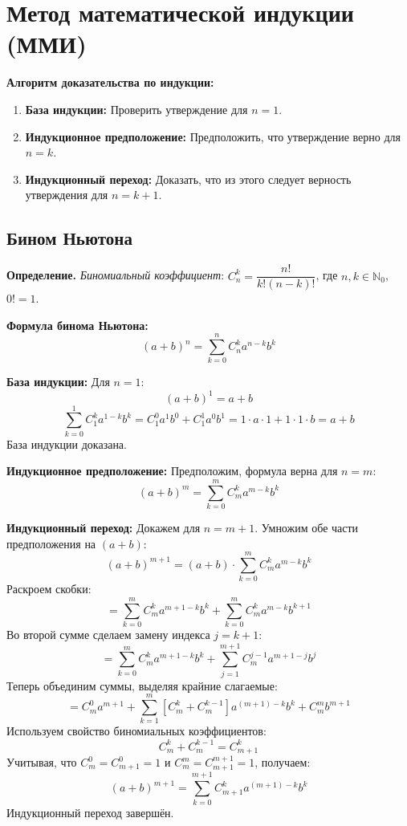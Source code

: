 \documentclass[12pt, paper]{article}
\begin{document}
\section{Метод математической индукции (ММИ)}
\begin{tcolorbox}
\textbf{Алгоритм доказательства по индукции:}
\begin{enumerate}
    \item \textbf{База индукции:} Проверить утверждение для $n = 1$.
    \item \textbf{Индукционное предположение:} Предположить, что утверждение верно для $n = k$.
    \item \textbf{Индукционный переход:} Доказать, что из этого следует верность утверждения для $n = k+1$.
\end{enumerate}
\end{tcolorbox}

\subsection{Бином Ньютона}
\begin{tcolorbox}
\textbf{Определение.} \textit{Биномиальный коэффициент}:
$C_n^k = \dfrac{n!}{k!(n-k)!}$, где $n,k \in \mathbb{N}_0$, $0! = 1$.
\end{tcolorbox}

\begin{tcolorbox}
\textbf{Формула бинома Ньютона:}
$$(a+b)^n = \sum_{k=0}^{n} C_n^k a^{n-k}b^k$$
\end{tcolorbox}

\begin{tcolorbox}[title=Доказательство по ММИ, breakable]
\textbf{База индукции:} Для $n=1$:
$$(a+b)^1 = a + b$$
$$\sum_{k=0}^{1} C_1^k a^{1-k}b^k = C_1^0 a^1 b^0 + C_1^1 a^0 b^1 = 1 \cdot a \cdot 1 + 1 \cdot 1 \cdot b = a + b$$
База индукции доказана.

\textbf{Индукционное предположение:} Предположим, формула верна для $n = m$:
$$(a+b)^m = \sum_{k=0}^{m} C_m^k a^{m-k}b^k$$

\textbf{Индукционный переход:} Докажем для $n = m+1$.
Умножим обе части предположения на $(a+b)$:
$$(a+b)^{m+1} = (a+b) \cdot \sum_{k=0}^{m} C_m^k a^{m-k}b^k$$
Раскроем скобки:
$$= \sum_{k=0}^{m} C_m^k a^{m+1-k}b^k + \sum_{k=0}^{m} C_m^k a^{m-k}b^{k+1}$$
Во второй сумме сделаем замену индекса $j = k+1$:
$$= \sum_{k=0}^{m} C_m^k a^{m+1-k}b^k + \sum_{j=1}^{m+1} C_m^{j-1} a^{m+1-j}b^{j}$$
Теперь объединим суммы, выделяя крайние слагаемые:
$$= C_m^0 a^{m+1} + \sum_{k=1}^{m} \left[ C_m^k + C_m^{k-1} \right] a^{(m+1)-k}b^k + C_m^m b^{m+1}$$
Используем свойство биномиальных коэффициентов:
$$C_m^k + C_m^{k-1} = C_{m+1}^k$$
Учитывая, что $C_m^0 = C_{m+1}^0 = 1$ и $C_m^m = C_{m+1}^{m+1} = 1$, получаем:
$$(a+b)^{m+1} = \sum_{k=0}^{m+1} C_{m+1}^k a^{(m+1)-k}b^k$$
Индукционный переход завершён.
\end{tcolorbox}
\end{document}
